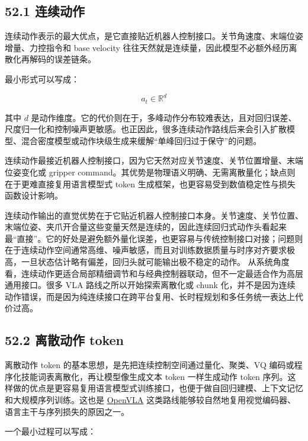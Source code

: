 \subsection*{52.1 连续动作}


连续动作表示的最大优点，是它直接贴近机器人控制接口。关节角速度、末端位姿增量、力控指令和 base velocity 往往天然就是连续量，因此模型不必额外经历离散化再解码的误差链条。

最小形式可以写成：

\begin{equation*}
a_t \in \mathbb{R}^d
\end{equation*}

其中 \(d\) 是动作维度。它的代价则在于，多峰动作分布较难表达，且对回归误差、尺度归一化和控制噪声更敏感。也正因此，很多连续动作路线后来会引入扩散模型、混合密度模型或动作块级生成来缓解“单峰回归过于保守”的问题。

连续动作最接近机器人控制接口，因为它天然对应关节速度、关节位置增量、末端位姿变化或 gripper command。其优势是物理语义明确、无需离散量化；缺点则在于更难直接复用语言模型式 token 生成框架，也更容易受到数值稳定性与损失函数设计影响。

连续动作输出的直觉优势在于它贴近机器人控制接口本身。关节速度、关节位置、末端位姿、夹爪开合量这些变量天然是连续的，因此连续回归式动作头看起来最“直接”。它的好处是避免额外量化误差，也更容易与传统控制接口对接；问题则在于连续动作空间通常高维、噪声敏感，而且对训练数据质量与时序对齐要求极高，一旦状态估计略有偏差，回归头就可能输出极不稳定的动作。 从系统角度看，连续动作更适合局部精细调节和与经典控制器联动，但不一定最适合作为高层通用接口。很多 VLA 路线之所以开始探索离散化或 chunk 化，并不是因为连续动作错误，而是因为纯连续接口在跨平台复用、长时程规划和多任务统一表达上代价过高。

\subsection*{52.2 离散动作 token}


离散动作 token 的基本思想，是先把连续控制空间通过量化、聚类、VQ 编码或程序化技能词表离散化，再让模型像生成文本 token 一样生成动作 token 序列。这样做的优点是更容易复用语言模型式训练接口，也便于做自回归建模、上下文记忆和大规模序列训练。这也是 \href{https://arxiv.org/abs/2406.09246}{OpenVLA} 这类路线能够较自然地复用视觉编码器、语言主干与序列损失的原因之一。

一个最小过程可以写成：

